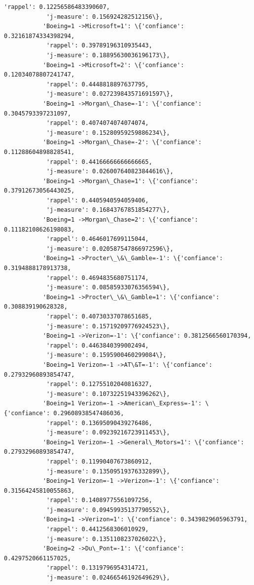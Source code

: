 \documentclass[11pt]{article}
\begin{document}
\begin{Verbatim}[commandchars=\\\{\}]
            'rappel': 0.12256586483390607,
            'j-measure': 0.156924282512156\},
           'Boeing=1 ->Microsoft=1': \{'confiance': 0.32161874334398294,
            'rappel': 0.39789196310935443,
            'j-measure': 0.18895630036196173\},
           'Boeing=1 ->Microsoft=2': \{'confiance': 0.12034078807241747,
            'rappel': 0.4448818897637795,
            'j-measure': 0.027239843571691597\},
           'Boeing=1 ->Morgan\_Chase=-1': \{'confiance': 0.3045793397231097,
            'rappel': 0.4074074074074074,
            'j-measure': 0.15280959259886234\},
           'Boeing=1 ->Morgan\_Chase=-2': \{'confiance': 0.11288604898828541,
            'rappel': 0.44166666666666665,
            'j-measure': 0.026007640823844616\},
           'Boeing=1 ->Morgan\_Chase=1': \{'confiance': 0.37912673056443025,
            'rappel': 0.4405940594059406,
            'j-measure': 0.16843767851854277\},
           'Boeing=1 ->Morgan\_Chase=2': \{'confiance': 0.11182108626198083,
            'rappel': 0.4646017699115044,
            'j-measure': 0.020587547866972596\},
           'Boeing=1 ->Procter\_\&\_Gamble=-1': \{'confiance': 0.3194888178913738,
            'rappel': 0.4694835680751174,
            'j-measure': 0.08585933076356594\},
           'Boeing=1 ->Procter\_\&\_Gamble=1': \{'confiance': 0.308839190628328,
            'rappel': 0.40730337078651685,
            'j-measure': 0.15719209776924523\},
           'Boeing=1 ->Verizon=-1': \{'confiance': 0.3812566560170394,
            'rappel': 0.4463840399002494,
            'j-measure': 0.1595900460299084\},
           'Boeing=1 Verizon=-1 ->AT\&T=-1': \{'confiance': 0.27932960893854747,
            'rappel': 0.12755102040816327,
            'j-measure': 0.10732251943396262\},
           'Boeing=1 Verizon=-1 ->American\_Express=-1': \{'confiance': 0.29608938547486036,
            'rappel': 0.13695090439276486,
            'j-measure': 0.09239216723911453\},
           'Boeing=1 Verizon=-1 ->General\_Motors=1': \{'confiance': 0.27932960893854747,
            'rappel': 0.11990407673860912,
            'j-measure': 0.13509519376332899\},
           'Boeing=1 Verizon=-1 ->Verizon=-1': \{'confiance': 0.31564245810055863,
            'rappel': 0.14089775561097256,
            'j-measure': 0.09459935137790552\},
           'Boeing=1 ->Verizon=1': \{'confiance': 0.3439829605963791,
            'rappel': 0.4412568306010929,
            'j-measure': 0.1351108237026022\},
           'Boeing=2 ->Du\_Pont=-1': \{'confiance': 0.4297520661157025,
            'rappel': 0.1319796954314721,
            'j-measure': 0.02466546192649629\},

\end{Verbatim}
\end{document}

